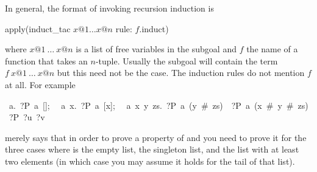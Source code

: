 \begin{isabelle}
\begin{isamarkuptext}
In general, the format of invoking recursion induction is
\begin{ttbox}
apply(induct_tac \(x@1 \dots x@n\) rule: \(f\).induct)
\end{ttbox}%
where $x@1~\dots~x@n$ is a list of free variables in the subgoal and $f$ the
name of a function that takes an $n$-tuple. Usually the subgoal will
contain the term $f~x@1~\dots~x@n$ but this need not be the case. The
induction rules do not mention $f$ at all. For example 
\begin{isabellepar}%
{\isasymlbrakk}~{\isasymAnd}a.~?P~a~[];\isanewline
~~{\isasymAnd}a~x.~?P~a~[x];\isanewline
~~{\isasymAnd}a~x~y~zs.~?P~a~(y~\#~zs)~{\isasymLongrightarrow}~?P~a~(x~\#~y~\#~zs){\isasymrbrakk}\isanewline
{\isasymLongrightarrow}~?P~?u~?v%
\end{isabellepar}%
merely says that in order to prove a property  of  and
 you need to prove it for the three cases where  is the
empty list, the singleton list, and the list with at least two elements
(in which case you may assume it holds for the tail of that list).%
\end{isamarkuptext}%
\end{isabelle}%
